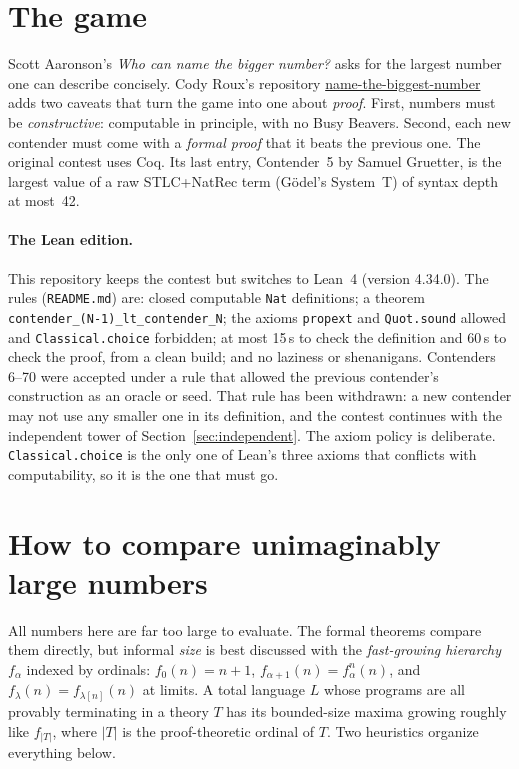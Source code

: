 \documentclass[11pt]{article}
\theoremstyle{definition}
\theoremstyle{remark}
\newcommand{\lean}[1]{\texttt{#1}}
\begin{document}
\section{The game}

Scott Aaronson's \emph{Who can name the bigger number?} asks for the largest
number one can describe concisely. Cody Roux's repository
\href{https://github.com/codyroux/name-the-biggest-number}{name-the-biggest-number}
adds two caveats that turn the game into one about \emph{proof}. First, numbers
must be \emph{constructive}: computable in principle, with no Busy Beavers.
Second, each new contender must come with a \emph{formal proof} that it beats
the previous one. The original contest uses Coq. Its last entry, Contender~5 by
Samuel Gruetter, is the largest value of a raw STLC+NatRec term (G\"odel's
System~T) of syntax depth at most~42.

\paragraph{The Lean edition.} This repository keeps the contest but switches to
Lean~4 (version 4.34.0). The rules (\texttt{README.md}) are: closed computable
\lean{Nat} definitions; a theorem \lean{contender\_(N-1)\_lt\_\allowbreak contender\_N};
the axioms \lean{propext} and \lean{Quot.sound} allowed and
\lean{Classical.choice} forbidden; at most 15\,s to check the definition and
60\,s to check the proof, from a clean build; and no laziness or shenanigans.
Contenders 6--70 were accepted under a rule that allowed the previous
contender's construction as an oracle or seed. That rule has been withdrawn:
a new contender may not use any smaller one in its definition, and the
contest continues with the independent tower of
Section~\ref{sec:independent}. The axiom policy is deliberate. \lean{Classical.choice} is the only one of
Lean's three axioms that conflicts with computability, so it is the one that
must go.

\section{How to compare unimaginably large numbers}

All numbers here are far too large to evaluate. The formal theorems compare them
directly, but informal \emph{size} is best discussed with the
\emph{fast-growing hierarchy} $f_\alpha$ indexed by ordinals: $f_0(n)=n+1$,
$f_{\alpha+1}(n)=f_\alpha^{n}(n)$, and $f_\lambda(n)=f_{\lambda[n]}(n)$ at
limits. A total language $L$ whose programs are all provably terminating in a
theory $T$ has its bounded-size maxima growing roughly like $f_{|T|}$, where
$|T|$ is the proof-theoretic ordinal of $T$. Two heuristics organize everything
below.
\end{document}
